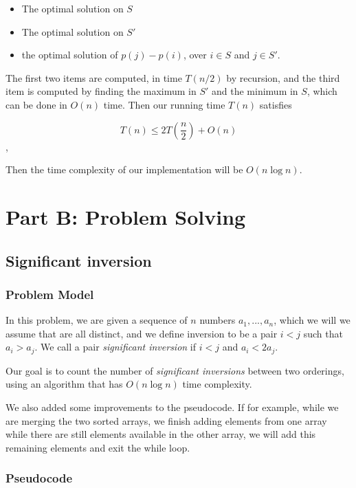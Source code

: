 \documentclass{article}
\begin{document}
\begin{itemize}
 \item The optimal solution on $S$
 \item The optimal solution on $S'$
 \item the optimal solution of $p(j)-p(i)$, over $i \in S$ and $j \in S'$.
\end{itemize}

The first two items are computed, in time $T(n/2)$ by recursion, and the third item is computed by finding the maximum in $S'$ and the minimum in $S$, which can be done in $O(n)$ time. Then our running time $T(n)$ satisfies

$$T(n) \leq 2T(\frac{n}{2})+O(n)$$,

Then the time complexity of our implementation will be $O(n\log n)$.


\section*{Part B: Problem Solving}

\subsection*{Significant inversion}

\subsubsection*{Problem Model}

In this problem, we are given a sequence of $n$ numbers $a_1,...,a_n$, which we will we assume that are all distinct, and we define inversion to be a pair $i<j$ such that $a_i>a_j$. We call a pair \textit{significant inversion} if $i<j$ and $a_i<2a_j$.

Our goal is to count the number of \textit{significant inversions} between two orderings, using an algorithm that has $O(n \log n)$ time complexity.

We also added some improvements to the pseudocode. If for example, while we are merging the two sorted arrays, we finish adding elements from one array while there are still elements available in the other array, we will add this remaining elements and exit the while loop.

\subsubsection*{Pseudocode}
\end{document}
